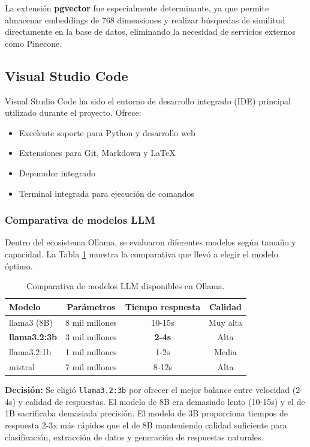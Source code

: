 La extensión \textbf{pgvector} fue especialmente determinante, ya que permite almacenar embeddings de 768 dimensiones y realizar búsquedas de similitud directamente en la base de datos, eliminando la necesidad de servicios externos como Pinecone.

\subsection{Visual Studio Code}

Visual Studio Code ha sido el entorno de desarrollo integrado (IDE) principal utilizado durante el proyecto. Ofrece:

\begin{itemize}
    \item Excelente soporte para Python y desarrollo web
    \item Extensiones para Git, Markdown y LaTeX
    \item Depurador integrado
    \item Terminal integrada para ejecución de comandos
\end{itemize}

\subsubsection{Comparativa de modelos LLM}

Dentro del ecosistema Ollama, se evaluaron diferentes modelos según tamaño y capacidad. La Tabla \ref{tab:comp-modelos-llm} muestra la comparativa que llevó a elegir el modelo óptimo.

\begin{table}[h]
\centering
\begin{tabular}{|l|c|c|c|}
\hline
\textbf{Modelo} & \textbf{Parámetros} & \textbf{Tiempo respuesta} & \textbf{Calidad} \\ \hline
llama3 (8B) & 8 mil millones & 10-15s & Muy alta \\ \hline
\textbf{llama3.2:3b} & 3 mil millones & \textbf{2-4s} & Alta \\ \hline
llama3.2:1b & 1 mil millones & 1-2s & Media \\ \hline
mistral & 7 mil millones & 8-12s & Alta \\ \hline
\end{tabular}
\caption{Comparativa de modelos LLM disponibles en Ollama.}
\label{tab:comp-modelos-llm}
\end{table}

\textbf{Decisión:} Se eligió \texttt{llama3.2:3b} por ofrecer el mejor balance entre velocidad (2-4s) y calidad de respuestas. El modelo de 8B era demasiado lento (10-15s) y el de 1B sacrificaba demasiada precisión. El modelo de 3B proporciona tiempos de respuesta 2-3x más rápidos que el de 8B manteniendo calidad suficiente para clasificación, extracción de datos y generación de respuestas naturales.

